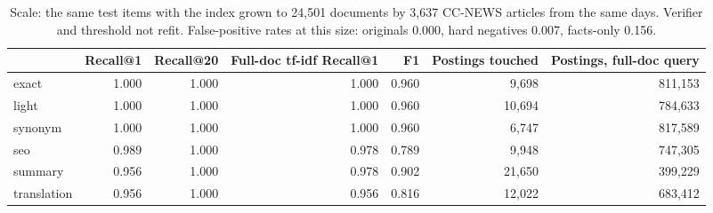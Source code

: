 \documentclass[11pt,a4paper]{article}
\newcommand{\hd}[1]{{\headfont\bfseries\footnotesize #1}}
\newcommand{\hrow}{\rowcolor{paper}}
\begin{document}
\begin{table}[H]
  \centering\small
  \caption{Scale: the same test items with the index grown to 24,501 documents by 3,637 CC-NEWS articles from the same days. Verifier and threshold not refit. False-positive rates at this size: originals 0.000, hard negatives 0.007, facts-only 0.156.}
  \label{tab:scale}
  \begin{tabularx}{\textwidth}{@{}l*{6}{R}@{}}
    \toprule
    \hrow \hd{Level} & \hd{Recall@1} & \hd{Recall@20} & \hd{Full-doc tf-idf Recall@1} & \hd{F1} & \hd{Postings touched} & \hd{Postings, full-doc query} \\
    \midrule
    exact & 1.000 & 1.000 & 1.000 & 0.960 & 9,698 & 811,153 \\
    light & 1.000 & 1.000 & 1.000 & 0.960 & 10,694 & 784,633 \\
    synonym & 1.000 & 1.000 & 1.000 & 0.960 & 6,747 & 817,589 \\
    seo & 0.989 & 1.000 & 0.978 & 0.789 & 9,948 & 747,305 \\
    summary & 0.956 & 1.000 & 0.978 & 0.902 & 21,650 & 399,229 \\
    translation & 0.956 & 1.000 & 0.956 & 0.816 & 12,022 & 683,412 \\
    \bottomrule
  \end{tabularx}
\end{table}
\end{document}

